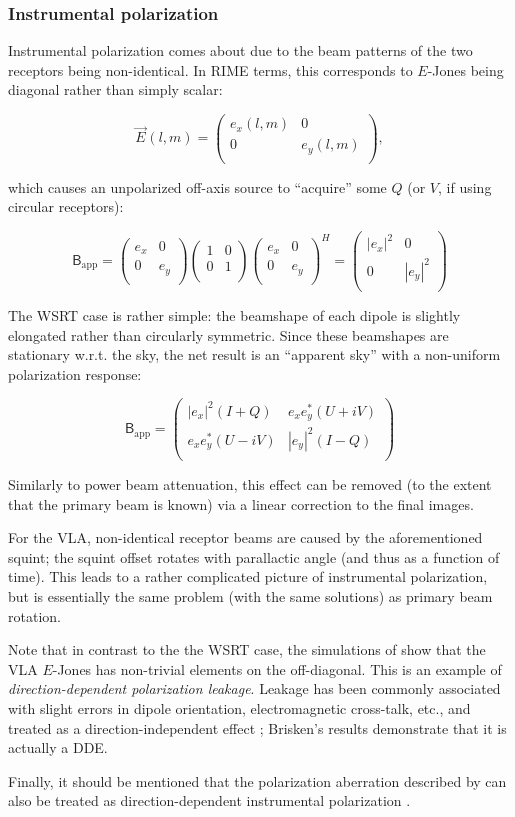 \documentclass{aa}
\newcommand{\matrixtt}[4]{\left( \begin{array}{cc}#1&#2\\#3&#4\\\end{array} \right)}
\newcommand{\herm}{H}
\newcommand{\jones}[2]{\vec {#1}_{#2}}
\newcommand{\coh}[2]{\mathsf{{#1}}_{{#2}}}
\begin{document}
\subsubsection{Instrumental polarization}

Instrumental polarization comes about due to the beam patterns of the two receptors being non-identical. In RIME terms, this corresponds to $E$-Jones being diagonal rather than simply scalar:

\[
\jones{E}{}(l,m) = \matrixtt{e_x(l,m)}{0}{0}{e_y(l,m)},
\]

which causes an unpolarized off-axis source to ``acquire'' some $Q$ (or $V$, if using circular receptors):

\[
\coh{B}{\mathrm{app}} = \matrixtt{e_x}{0}{0}{e_y} 
\matrixtt{1}{0}{0}{1}
\matrixtt{e_x}{0}{0}{e_y}^\herm =
\matrixtt{|e_x|^2}{0}{0}{|e_y|^2}
\]

The WSRT case is rather simple: the beamshape of each dipole is slightly elongated rather than circularly symmetric. Since these beamshapes are stationary w.r.t. the sky, the net result is an ``apparent sky'' with a non-uniform polarization response: 

\[
\coh{B}{\mathrm{app}} = \matrixtt{|e_x|^2(I+Q)}{e_x e^*_y(U+iV)}{e_x e^*_y(U-iV)}{|e_y|^2(I-Q)}
\]

Similarly to power beam attenuation, this effect can be removed (to the extent that the primary beam is known) via a linear correction to the final images.

For the VLA, non-identical receptor beams are caused by the aforementioned squint; the squint offset rotates with parallactic angle (and thus as a function of time). This leads to a rather complicated picture of instrumental polarization, but is essentially the same problem (with the same solutions) as primary beam rotation.

Note that in contrast to the the WSRT case, the simulations of \citet{Brisken:VLA-beam} show that the VLA $E$-Jones has non-trivial elements on the off-diagonal. This is an example of \emph{direction-dependent polarization leakage}. Leakage has been commonly associated with slight errors in dipole orientation, electromagnetic cross-talk, etc., and treated as a direction-independent effect \citep{ME1,JEN:note185}; Brisken's results demonstrate that it is actually a DDE.

Finally, it should be mentioned that the polarization aberration described by \citet{Carozzi:ME3D} can also be treated as direction-dependent instrumental polarization \citep[see Paper I,][Sect.~5.4]{RRIME1}.
\end{document}
